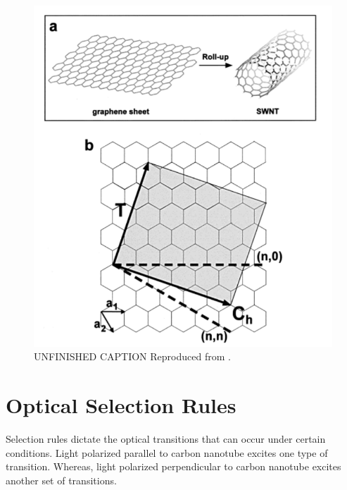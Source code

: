 \begin{figure}[H]
	\centering
	\includegraphics[scale=0.7]{images/chapter_optical_props/chiral_vectors.png}
	\caption{{\color{red}UNFINISHED CAPTION} Reproduced from \cite{odom2000structure}.}
	\label{fig:chiral_vectors}
\end{figure}


\section{Optical Selection Rules}

Selection rules dictate the optical transitions that can occur under certain conditions. Light polarized parallel to carbon nanotube excites one type of transition. Whereas, light polarized perpendicular to carbon nanotube excites another set of transitions.



